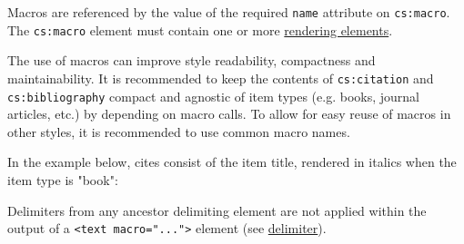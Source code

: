Macros are referenced by the value of the required \texttt{name}
attribute on \texttt{cs:macro}. The \texttt{cs:macro} element must
contain one or more \protect\hyperlink{rendering-elements}{rendering
elements}.

The use of macros can improve style readability, compactness and
maintainability. It is recommended to keep the contents of
\texttt{cs:citation} and \texttt{cs:bibliography} compact and agnostic
of item types (e.g. books, journal articles, etc.) by depending on macro
calls. To allow for easy reuse of macros in other styles, it is
recommended to use common macro names.

In the example below, cites consist of the item title, rendered in
italics when the item type is "book":

\begin{Shaded}
\begin{Highlighting}[]
\NormalTok{\textless{}}\NormalTok{\textgreater{}}
\NormalTok{  \textless{}}\NormalTok{\textgreater{}}
\NormalTok{    \textless{}}\NormalTok{\textgreater{}}
\NormalTok{      \textless{}}\NormalTok{\textgreater{}}
\NormalTok{        \textless{}}\NormalTok{/\textgreater{}}
\NormalTok{      \textless{}/}\NormalTok{\textgreater{}}
\NormalTok{      \textless{}}\NormalTok{\textgreater{}}
\NormalTok{        \textless{}}\NormalTok{/\textgreater{}}
\NormalTok{      \textless{}/}\NormalTok{\textgreater{}}
\NormalTok{    \textless{}/}\NormalTok{\textgreater{}}
\NormalTok{  \textless{}/}\NormalTok{\textgreater{}}
\NormalTok{  \textless{}}\NormalTok{\textgreater{}}
\NormalTok{    \textless{}}\NormalTok{\textgreater{}}
\NormalTok{      \textless{}}\NormalTok{/\textgreater{}}
\NormalTok{    \textless{}/}\NormalTok{\textgreater{}}
\NormalTok{  \textless{}/}\NormalTok{\textgreater{}}
\NormalTok{\textless{}/}\NormalTok{\textgreater{}}
\end{Highlighting}
\end{Shaded}

Delimiters from any ancestor delimiting element are not applied within
the output of a \texttt{\textless{}text\ macro="..."\textgreater{}}
element (see \protect\hyperlink{delimiter}{delimiter}).

